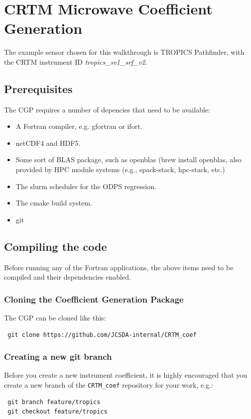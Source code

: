 \section{CRTM Microwave Coefficient Generation}
The example sensor chosen for this walkthrough is TROPICS Pathfinder, with the CRTM instrument ID \emph{tropics\_sv1\_srf\_v2}.

\subsection{Prerequisites}
The CGP requires a number of depencies that need to be available:
\begin{itemize}
  \item A Fortran compiler, e.g. gfortran or ifort.
  \item netCDF4 and HDF5.
  \item Some sort of BLAS package, such as openblas (brew install openblas, also provided by HPC module systems (e.g., spack-stack, hpc-stack, etc.)
  \item The slurm scheduler for the ODPS regression.
  \item The cmake build system.
  \item git
\end{itemize}

\subsection{Compiling the code}
Before running any of the Fortran applications, the above items need to be compiled and their dependencies enabled.

\subsubsection{Cloning the Coefficient Generation Package}
The CGP can be cloned like this:
\begin{verbatim}
 git clone https://github.com/JCSDA-internal/CRTM_coef
\end{verbatim}

\subsubsection{Creating a new git branch}
Before you create a new instrument coefficient, it is highly encouraged that you create a new branch of the \verb|CRTM_coef| repository for your work, e.g.:
\begin{verbatim}
 git branch feature/tropics
 git checkout feature/tropics
\end{verbatim}

